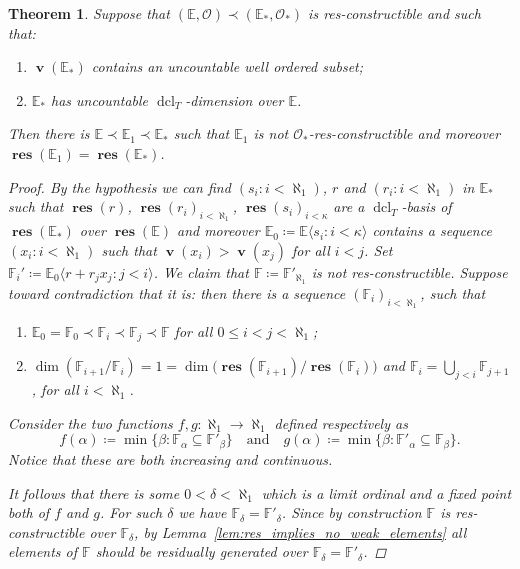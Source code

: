 \documentclass{amsart}
\newtheorem{theorem}{Theorem}
\theoremstyle{remark}
\theoremstyle{definition}
\theoremstyle{plain}
\newcommand{\bE}{\mathbb E}
\newcommand{\bF}{\mathbb F}
\newcommand{\cO}{\mathcal O}
\DeclareMathOperator{\val}{\mathbf{v}}
\DeclareMathOperator{\res}{\mathbf{res}}
\DeclareMathOperator{\dcl}{\mathrm{dcl}}
\theoremstyle{plain}
\begin{document}
\begin{theorem}\label{thm:mainthm_negative}
     Suppose that $(\bE, \cO) \prec (\bE_*, \cO_*)$ is res-constructible and such that:
     \begin{enumerate}
         \item $\val(\bE_*)$ contains an uncountable well ordered subset;
         \item $\bE_*$ has uncountable $\dcl_T$-dimension over $\bE$. 
     \end{enumerate}
     Then there is $\bE \prec \bE_1 \prec \bE_*$ such that $\bE_1$ is not $\cO_*$-res-constructible and moreover $\res(\bE_1)=\res(\bE_*)$.
    \begin{proof}
        By the hypothesis we can find $(s_i: i < \aleph_1)$, $r$ and $(r_i : i <\aleph_1)$ in $\bE_*$ such that $\res(r)$, $\res(r_i)_{i<\aleph_1}$, $\res(s_i)_{i< \kappa}$ are a $\dcl_T$-basis of $\res(\bE_*)$ over $\res(\bE)$ and moreover $\bE_0\coloneqq  \bE \langle s_i : i< \kappa\rangle$ contains a sequence $(x_i: i<\aleph_1)$ such that $\val(x_i)>\val(x_j)$ for all $i < j$.
        Set $\bF_i'\coloneqq  \bE_0 \langle r + r_j x_j: j < i\rangle$. We claim that $\bF\coloneqq \bF'_{\aleph_1}$ is not res-constructible. Suppose toward contradiction that it is: then there is a sequence $(\bF_i)_{i < \aleph_1}$, such that
        \begin{enumerate}
            \item $\bE_0= \bF_0\prec \bF_i\prec \bF_j \prec \bF$ for all $0 \le i<j<\aleph_1$;
            \item $\dim(\bF_{i+1}/\bF_{i})=1= \dim \big( \res(\bF_{i+1})/\res(\bF_i)\big)$ and $\bF_{i} = \bigcup_{j<i}\bF_{j+1}$, for all $i<\aleph_1$.
        \end{enumerate}
        Consider the two functions $f, g: \aleph_1 \to \aleph_1$ defined respectively as
        \[f(\alpha)\coloneqq  \min \{\beta: \bF_\alpha \subseteq \bF'_{\beta}\} \quad \text{and} \quad g(\alpha)\coloneqq \min \{\beta: \bF'_\alpha \subseteq \bF_{\beta}\}.\]
        Notice that these are both increasing and continuous.

        It follows that there is some $0<\delta<\aleph_1$ which is a limit ordinal and a fixed point both of $f$ and $g$. For such $\delta$ we have $\bF_{\delta}=\bF'_\delta$. Since by construction $\bF$ is res-constructible over $\bF_\delta$, by Lemma~\ref{lem:res_implies_no_weak_elements} all elements of $\bF$ should be residually generated over $\bF_\delta=\bF'_\delta$.
        

\end{proof}
\end{theorem}
\end{document}
